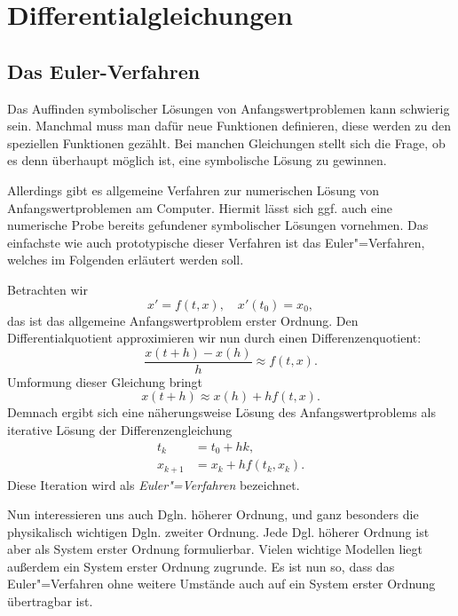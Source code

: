 
\chapter{Differentialgleichungen}

\section{Das Euler-Verfahren}

Das Auffinden symbolischer Lösungen von Anfangswertproblemen kann
schwierig sein. Manchmal muss man dafür neue Funktionen definieren,
diese werden zu den speziellen Funktionen gezählt. Bei manchen
Gleichungen stellt sich die Frage, ob es denn überhaupt möglich ist,
eine symbolische Lösung zu gewinnen.

Allerdings gibt es allgemeine Verfahren zur numerischen Lösung von
Anfangswertproblemen am Computer. Hiermit lässt sich ggf. auch eine
numerische Probe bereits gefundener symbolischer Lösungen vornehmen.
Das einfachste wie auch prototypische dieser Verfahren ist das
Euler"=Verfahren, welches im Folgenden erläutert werden soll.

Betrachten wir
\begin{equation}\label{eq:AWP-O1}
x' = f(t,x),\quad x'(t_0) = x_0,
\end{equation}
das ist das allgemeine Anfangswertproblem erster Ordnung. Den
Differentialquotient approximieren wir nun durch einen
Differenzenquotient:%
\begin{equation}
\frac{x(t+h)-x(h)}{h} \approx f(t,x).
\end{equation}
Umformung dieser Gleichung bringt
\begin{equation}
x(t+h)\approx x(h)+hf(t,x).
\end{equation}
Demnach ergibt sich eine näherungsweise Lösung des Anfangswertproblems
als iterative Lösung der Differenzengleichung%
\begin{align}
t_{k} &= t_0+hk,\\
x_{k+1} &= x_k+hf(t_k,x_k).
\end{align}
Diese Iteration wird als \emph{Euler"=Verfahren} bezeichnet.

Nun interessieren uns auch Dgln. höherer Ordnung, und ganz besonders
die physikalisch wichtigen Dgln. zweiter Ordnung. Jede Dgl. höherer
Ordnung ist aber als System erster Ordnung formulierbar. Vielen
wichtige Modellen liegt außerdem ein System erster Ordnung zugrunde.
Es ist nun so, dass das Euler"=Verfahren ohne weitere Umstände auch
auf ein System erster Ordnung übertragbar ist.

